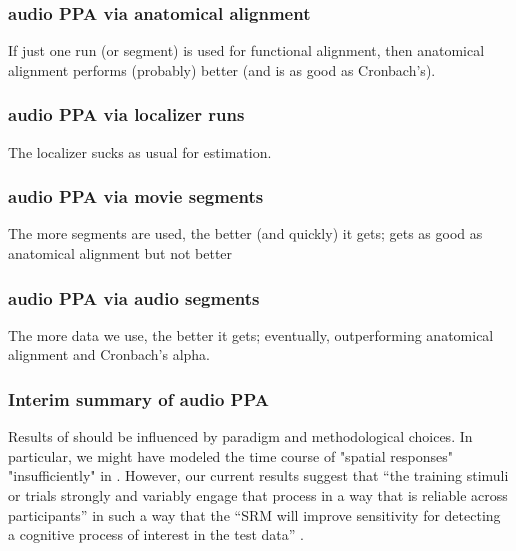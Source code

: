 \subsubsection{audio PPA via anatomical alignment}

If just one run (or segment) is used for functional alignment, then anatomical
alignment performs (probably) better (and is as good as Cronbach's).


\subsubsection{audio PPA via localizer runs}


%
The localizer sucks as usual for estimation.


\subsubsection{audio PPA via movie segments}


The more segments are used, the better (and quickly) it gets; gets as good as
anatomical alignment but not better


\subsubsection{audio PPA via audio segments}


The more data we use, the better it gets; eventually, outperforming anatomical
alignment and Cronbach's alpha.


\subsubsection{Interim summary of audio PPA}



%
Results of \citet{haeusler2022processing} should be influenced by paradigm and
methodological choices.
%
In particular, we might have modeled the time course of "spatial responses"
"insufficiently" in \citet{haeusler2022processing}.
%
However, our current results suggest that ``the training stimuli or trials
strongly and variably engage that process in a way that is reliable across
participants'' in such a way that the ``SRM will improve sensitivity for
detecting a cognitive process of interest in the test data''
\citep{cohen2017computational}.

